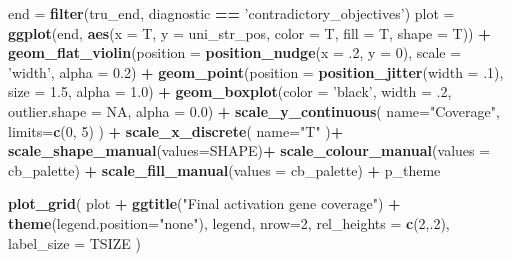 \documentclass[]{book}
\newenvironment{Shaded}{\begin{snugshade}}{\end{snugshade}}
\newcommand{\DataTypeTok}[1]{\textcolor[rgb]{0.13,0.29,0.53}{#1}}
\newcommand{\DecValTok}[1]{\textcolor[rgb]{0.00,0.00,0.81}{#1}}
\newcommand{\FloatTok}[1]{\textcolor[rgb]{0.00,0.00,0.81}{#1}}
\newcommand{\KeywordTok}[1]{\textcolor[rgb]{0.13,0.29,0.53}{\textbf{#1}}}
\newcommand{\NormalTok}[1]{#1}
\newcommand{\OperatorTok}[1]{\textcolor[rgb]{0.81,0.36,0.00}{\textbf{#1}}}
\newcommand{\OtherTok}[1]{\textcolor[rgb]{0.56,0.35,0.01}{#1}}
\newcommand{\StringTok}[1]{\textcolor[rgb]{0.31,0.60,0.02}{#1}}
\begin{document}
\begin{Shaded}
\begin{Highlighting}[]
\NormalTok{end =}\StringTok{ }\KeywordTok{filter}\NormalTok{(tru_end, diagnostic }\OperatorTok{==}\StringTok{ 'contradictory_objectives'}\NormalTok{)}
\NormalTok{plot =}\StringTok{ }\KeywordTok{ggplot}\NormalTok{(end, }\KeywordTok{aes}\NormalTok{(}\DataTypeTok{x =}\NormalTok{ T, }\DataTypeTok{y =}\NormalTok{ uni_str_pos, }\DataTypeTok{color =}\NormalTok{ T, }\DataTypeTok{fill =}\NormalTok{ T, }\DataTypeTok{shape =}\NormalTok{ T)) }\OperatorTok{+}
\StringTok{  }\KeywordTok{geom_flat_violin}\NormalTok{(}\DataTypeTok{position =} \KeywordTok{position_nudge}\NormalTok{(}\DataTypeTok{x =} \FloatTok{.2}\NormalTok{, }\DataTypeTok{y =} \DecValTok{0}\NormalTok{), }\DataTypeTok{scale =} \StringTok{'width'}\NormalTok{, }\DataTypeTok{alpha =} \FloatTok{0.2}\NormalTok{) }\OperatorTok{+}
\StringTok{  }\KeywordTok{geom_point}\NormalTok{(}\DataTypeTok{position =} \KeywordTok{position_jitter}\NormalTok{(}\DataTypeTok{width =} \FloatTok{.1}\NormalTok{), }\DataTypeTok{size =} \FloatTok{1.5}\NormalTok{, }\DataTypeTok{alpha =} \FloatTok{1.0}\NormalTok{) }\OperatorTok{+}
\StringTok{  }\KeywordTok{geom_boxplot}\NormalTok{(}\DataTypeTok{color =} \StringTok{'black'}\NormalTok{, }\DataTypeTok{width =} \FloatTok{.2}\NormalTok{, }\DataTypeTok{outlier.shape =} \OtherTok{NA}\NormalTok{, }\DataTypeTok{alpha =} \FloatTok{0.0}\NormalTok{) }\OperatorTok{+}
\StringTok{  }\KeywordTok{scale_y_continuous}\NormalTok{(}
    \DataTypeTok{name=}\StringTok{"Coverage"}\NormalTok{,}
    \DataTypeTok{limits=}\KeywordTok{c}\NormalTok{(}\DecValTok{0}\NormalTok{, }\DecValTok{5}\NormalTok{)}
\NormalTok{  ) }\OperatorTok{+}
\StringTok{  }\KeywordTok{scale_x_discrete}\NormalTok{(}
    \DataTypeTok{name=}\StringTok{"T"}
\NormalTok{  )}\OperatorTok{+}
\StringTok{  }\KeywordTok{scale_shape_manual}\NormalTok{(}\DataTypeTok{values=}\NormalTok{SHAPE)}\OperatorTok{+}
\StringTok{  }\KeywordTok{scale_colour_manual}\NormalTok{(}\DataTypeTok{values =}\NormalTok{ cb_palette) }\OperatorTok{+}
\StringTok{  }\KeywordTok{scale_fill_manual}\NormalTok{(}\DataTypeTok{values =}\NormalTok{ cb_palette) }\OperatorTok{+}
\StringTok{  }\NormalTok{p_theme}

\KeywordTok{plot_grid}\NormalTok{(}
\NormalTok{  plot }\OperatorTok{+}
\StringTok{    }\KeywordTok{ggtitle}\NormalTok{(}\StringTok{"Final activation gene coverage"}\NormalTok{) }\OperatorTok{+}
\StringTok{    }\KeywordTok{theme}\NormalTok{(}\DataTypeTok{legend.position=}\StringTok{"none"}\NormalTok{),}
\NormalTok{  legend,}
  \DataTypeTok{nrow=}\DecValTok{2}\NormalTok{,}
  \DataTypeTok{rel_heights =} \KeywordTok{c}\NormalTok{(}\DecValTok{2}\NormalTok{,.}\DecValTok{2}\NormalTok{),}
  \DataTypeTok{label_size =}\NormalTok{ TSIZE}
\NormalTok{)}
\end{Highlighting}
\end{Shaded}
\end{document}
